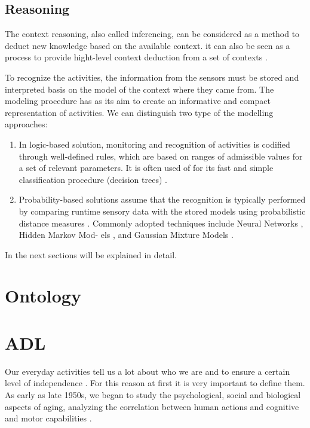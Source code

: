 \documentclass{thesisreport}
\begin{document}
 
 \subsection{Reasoning}
 The context reasoning, also called inferencing, can be considered as a method to deduct new knowledge based on the available context.  
 it can also be seen as a process to provide hight-level context deduction from a set of contexts \cite{perera2014context}.
 
To recognize the activities, the information from the sensors must be stored and interpreted basis on the model of the context where they came from.  
The modeling procedure has as its aim to create an informative and compact representation of activities. 
We can distinguish two type of the modelling approaches: 
\begin{enumerate}
    \item In logic-based solution, monitoring and recognition of activities is codified through well-defined rules, which are based on ranges of admissible values for a set of relevant parameters. It is often used of for its fast and simple classification procedure (decision trees) \cite{phdthesis}. 
    \item Probability-based solutions assume that the recognition is typically performed by comparing runtime sensory data with the stored models using probabilistic distance measures \cite{phdthesis}. Commonly adopted techniques include Neural Networks \cite{krassnig2010user}, Hidden Markov Mod- els \cite{wiles2012meaning}, \cite{choudhury2008mobile} and Gaussian Mixture Models \cite{bruno2012human}.
\end{enumerate}
In the next sections will be explained in detail. 

\section{Ontology} \label{ontology}

\section{ADL}
Our everyday activities tell us a lot about who we are and to ensure a certain level of independence \cite{buoncompagni2017towards}. For this reason at first it is very important to define them. 
\\
As early as late 1950s, we began to study the psychological, social and biological aspects of aging, analyzing the correlation between human actions and cognitive and motor capabilities \cite{buoncompagni2017towards}. 
\\
\end{document}
